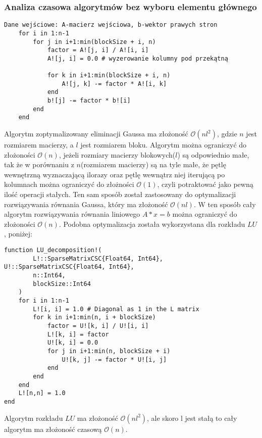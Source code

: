 \documentclass{article}
\begin{document}
\subsubsection{Analiza czasowa algorytmów bez wyboru elementu głównego}
\newpage
\begin{verbatim}
Dane wejściowe: A-macierz wejściowa, b-wektor prawych stron
    for i in 1:n-1
        for j in i+1:min(blockSize + i, n)
            factor = A![j, i] / A![i, i]
            A![j, i] = 0.0 # wyzerowanie kolumny pod przekątną

            for k in i+1:min(blockSize + i, n)
                A![j, k] -= factor * A![i, k]
            end
            b![j] -= factor * b![i]
        end
    end
\end{verbatim}
Algorytm zoptymalizowany eliminacji Gaussa ma złożoność $\mathcal{O}(nl^2)$, gdzie $n$ jest rozmiarem macierzy, a $l$ jest rozmiarem bloku. Algorytm można ograniczyć do złożoności $\mathcal{O}(n)$, jeżeli rozmiary macierzy blokowych($l$) są odpowiednio małe, tak że w porównaniu z $n$(rozmiarem macierzy) są na tyle małe, że pętlę wewnętrzną wyznaczającą ilorazy oraz pętlę wewnątrz niej iterującą  po kolumnach można ograniczyć do złożności $\mathcal{O}(1)$, czyli potraktować jako pewną ilość operacji stałych. Ten sam sposób został zastosowany do optymalizacji rozwiązywania równania Gaussa, który ma złożoność $\mathcal{O}(nl)$. W ten sposób cały algorytm rozwiązywania równania liniowego $A * x = b$ można ograniczyć do złożoności $\mathcal{O}(n)$. Podobna optymalizacja została wykorzystana dla rozkładu $LU$, poniżej:
\begin{verbatim}
function LU_decomposition!(
        L!::SparseMatrixCSC{Float64, Int64}, U!::SparseMatrixCSC{Float64, Int64},
        n::Int64, 
        blockSize::Int64
    ) 
    for i in 1:n-1
        L![i, i] = 1.0 # Diagonal as 1 in the L matrix
        for k in i+1:min(n, i + blockSize)
            factor = U![k, i] / U![i, i]
            L![k, i] = factor
            U![k, i] = 0.0
            for j in i+1:min(n, blockSize + i)
                U![k, j] -= factor * U![i, j]
            end
        end 
    end
    L![n,n] = 1.0
end
\end{verbatim}
Algorytm rozkładu $LU$ ma złożoność $\mathcal{O}(nl^2)$, ale skoro l jest stałą to cały algorytm ma złożoność czasową $\mathcal{O}(n)$.
\end{document}

